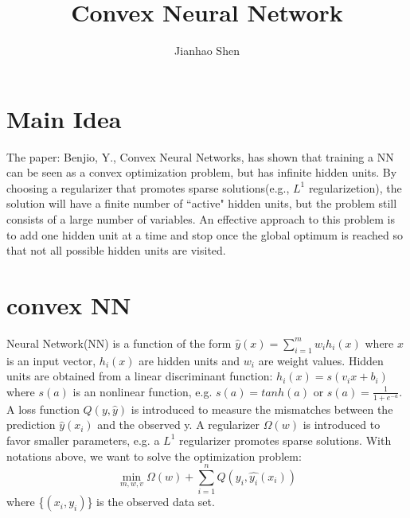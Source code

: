\documentclass{article}
\title{Convex Neural Network}
\author{Jianhao Shen}
\begin{document}
\maketitle
\section{Main Idea}
The paper: Benjio, Y., Convex Neural Networks, has shown that training a NN can be seen as a convex optimization problem, but has infinite hidden units. By choosing a regularizer that promotes sparse solutions(e.g., $L^{1}$ regularizetion),
 the solution will have a finite number of ``active" hidden units, but the problem still consists of a large number of variables. An effective approach to this problem is to add one hidden unit at a time and stop once the global optimum is reached so that not all possible hidden units are visited.
\section{convex NN}
Neural Network(NN) is a function of the form $\hat{y}(x) = \sum_{i=1}^{m} w_{i} h_{i}(x)$ where $x$ is an input vector, $h_{i}(x)$ are hidden units and $w_{i}$ are weight values. Hidden units are obtained from a linear discriminant function: $h_{i}(x) = s(v_{i}x+b_{i})$ where $s(a)$ is an nonlinear function, e.g. $s(a) = tanh(a)$ or $s(a) = \frac{1}{1+e^{-a}}$. A loss function $Q(y,\hat{y})$ is introduced to measure the mismatches between the prediction $\hat{y}(x_{i})$ and the observed y. A regularizer $\Omega(w)$ is introduced to favor smaller parameters, e.g. a $L^{1}$ regularizer promotes sparse solutions. With notations above, we want to solve the optimization problem:
\begin{equation}
\min_{m,w,v} \Omega(w) + \sum_{i=1}^{n}Q(y_{i},\hat{y_{i}}(x_{i})) 
\end{equation}
where \{$(x_{i},y_{i})$\} is the observed data set. 
\end{document}

